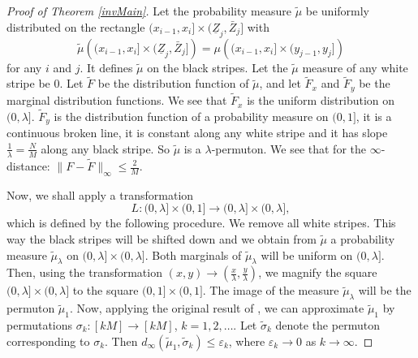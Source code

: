 \documentclass[12pt,twoside]{article}
\theoremstyle{definition}
\theoremstyle{remark}
\numberwithin{equation}{section}
\theoremstyle{plain}
\theoremstyle{remark}
\begin{document}
\begin{proof}[Proof of Theorem \ref{invMain}]
Let the probability measure $\tilde{\mu}$ be uniformly distributed on the rectangle
$
(x_{i-1}, x_i] \times ( \underline{Z}_j , \bar{Z}_j] 
$
with
$$
\tilde{\mu} \left((x_{i-1}, x_i] \times ( \underline{Z}_j , \bar{Z}_j] \right) =
{\mu} \left((x_{i-1}, x_i] \times ( y_{j-1} , y_j] \right) 
$$
for any $i$ and $j$.
It defines $\tilde{\mu}$ on the black stripes.
Let the $\tilde{\mu}$ measure of any white stripe be $0$. 
Let $\tilde{F}$ be the distribution function of $\tilde{\mu}$, and let
$\tilde{F}_x$ and $\tilde{F}_y$ be the marginal distribution functions.
We see that $\tilde{F}_x$ is the uniform distribution on $(0,\lambda]$.
$\tilde{F}_y$ is the distribution function of a probability measure on $(0,1]$, it is
a continuous broken line, it is constant along any white stripe and it has slope $\frac{1}{\lambda} = \frac{N}{M}$ along any black stripe.
So $\tilde{\mu}$ is a $\lambda$-permuton.
We see that for the $\infty$-distance: $\| F - \tilde{F} \|_\infty  \le \frac{2}{M}$.

Now, we shall apply a transformation 
$$
L: (0, \lambda] \times ( 0,1] \to (0, \lambda] \times ( 0,\lambda],
$$
which is defined by the following procedure.
We remove all white stripes.
This way the black stripes will be shifted down and we obtain from $\tilde{\mu}$ 
a probability measure $\tilde{\mu}_\lambda$ on $(0, \lambda] \times ( 0,\lambda]$.
Both marginals of $\tilde{\mu}_\lambda$ will be uniform on $(0, \lambda] $.
Then, using the transformation $(x,y) \to (\frac{x}{\lambda}, \frac{y}{\lambda})$, we magnify 
the square $(0, \lambda] \times ( 0,\lambda]$ to the square $(0, 1] \times ( 0,1]$.
The image of the measure $\tilde{\mu}_\lambda$ will be the permuton $\tilde{\mu}_1$.
Now, applying the original result of \cite{Hoppen},
we can approximate $\tilde{\mu}_1$ by permutations $\sigma_k : [kM] \to [kM]$, $k=1,2,\dots$.
Let $\tilde{\sigma}_k$ denote the permuton corresponding to $\sigma_k $.
Then $d_\infty(\tilde{\mu}_1 , \tilde{\sigma}_k) \le \varepsilon_k$,
where $\varepsilon_k \to 0$ as $k\to \infty$.


\end{proof}
\end{document}
